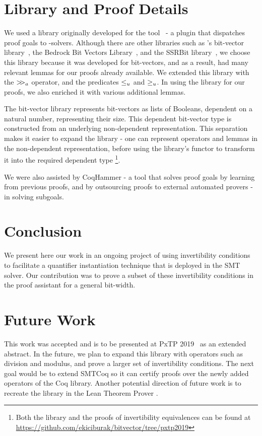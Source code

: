 \documentclass[10pt,conference]{IEEEtran}
\begin{document}
\section{Library and Proof Details}
\label{proofs}
We used a library originally developed for the
\smtcoq tool~\cite{DBLP:conf/cav/EkiciMTKKRB17} 
- a \coq plugin 
that dispatches proof goals to \smt-solvers.
Although there are other libraries such as 
\coq's bit-vector library~\cite{coqbvlib}, 
the Bedrock Bit Vectors Library~\cite{bbvlib}, and the SSRBit library~\cite{ssrbit},
we choose this library because it was developed 
for \smtlib bit-vectors, and as a result, had many 
relevant lemmas for our proofs already available.
We extended this library with the $\mathop{>\kern-.3em>_a}$
operator, and the predicates $\leq_u$ and $\geq_u$.
In using the library for our proofs, we also enriched 
it with various additional lemmas.

The bit-vector library represents bit-vectors as 
lists of Booleans, dependent on a natural number, 
representing their size. This dependent bit-vector 
type is constructed from an underlying non-dependent 
representation. This separation makes it easier to 
expand the library - one can represent operators 
and lemmas in the non-dependent representation, 
before using the library's functor to transform it 
into the required dependent type
\footnote{Both the library and the proofs of invertibility equivalences can be found at \url{https://github.com/ekiciburak/bitvector/tree/pxtp2019}}.

We were also assisted by CoqHammer - a tool that 
solves proof goals by learning from previous proofs, 
and by outsourcing proofs to external automated provers
 - in solving subgoals.
 
\section{Conclusion}
\label{conc}
We present here our work in an ongoing 
project of using invertibility conditions to facilitate a 
quantifier instantiation technique that is deployed in 
the \cvcfour SMT solver. Our contribution was to 
prove a subset of these invertibility conditions in the 
\coq proof assistant for a general bit-width. 

\section{Future Work}
\label{future}
This work was accepted and is to be presented at PxTP 
2019~\cite{b3} as an extended abstract.
In the future, we plan to expand this library 
with operators such as division and 
modulus, and prove a larger set of 
invertibility conditions. The next goal would be 
to extend SMTCoq so it can certify proofs 
over the newly added operators of the Coq library. 
Another potential 
direction of future work is to recreate the library 
in the Lean Theorem Prover \cite{conf/cade/MouraKADR15}.
\end{document}
